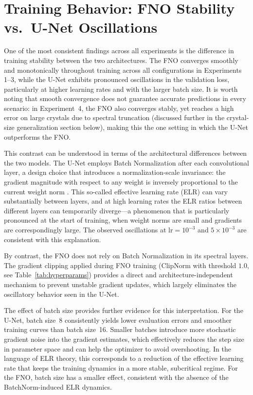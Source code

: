 \section{Training Behavior: FNO Stability vs.\ U-Net Oscillations}

One of the most consistent findings across all experiments is the difference in training stability between the two architectures. The FNO converges smoothly and monotonically throughout training across all configurations in Experiments 1--3, while the U-Net exhibits pronounced oscillations in the validation loss, particularly at higher learning rates and with the larger batch size. It is worth noting that smooth convergence does not guarantee accurate predictions in every scenario: in Experiment~4, the FNO also converges stably, yet reaches a high error on large crystals due to spectral truncation (discussed further in the crystal-size generalization section below), making this the one setting in which the U-Net outperforms the FNO.

This contrast can be understood in terms of the architectural differences between the two models. The U-Net employs Batch Normalization after each convolutional layer, a design choice that introduces a normalization-scale invariance: the gradient magnitude with respect to any weight is inversely proportional to the current weight norm \parencite{alimehmeti-gopel_weight_2024}. This so-called effective learning rate (ELR) can vary substantially between layers, and at high learning rates the ELR ratios between different layers can temporarily diverge—a phenomenon that is particularly pronounced at the start of training, when weight norms are small and gradients are correspondingly large. The observed oscillations at $\mathrm{lr} = 10^{-3}$ and $5 \times 10^{-3}$ are consistent with this explanation.

By contrast, the FNO does not rely on Batch Normalization in its spectral layers. The gradient clipping applied during FNO training (ClipNorm with threshold $1.0$, see Table~\ref{tab:hyperparams}) provides a direct and architecture-independent mechanism to prevent unstable gradient updates, which largely eliminates the oscillatory behavior seen in the U-Net.

The effect of batch size provides further evidence for this interpretation. For the U-Net, batch size~8 consistently yields lower evaluation errors and smoother training curves than batch size~16. Smaller batches introduce more stochastic gradient noise into the gradient estimates, which effectively reduces the step size in parameter space and can help the optimizer to avoid overshooting. In the language of ELR theory, this corresponds to a reduction of the effective learning rate that keeps the training dynamics in a more stable, subcritical regime. For the FNO, batch size has a smaller effect, consistent with the absence of the BatchNorm-induced ELR dynamics.

